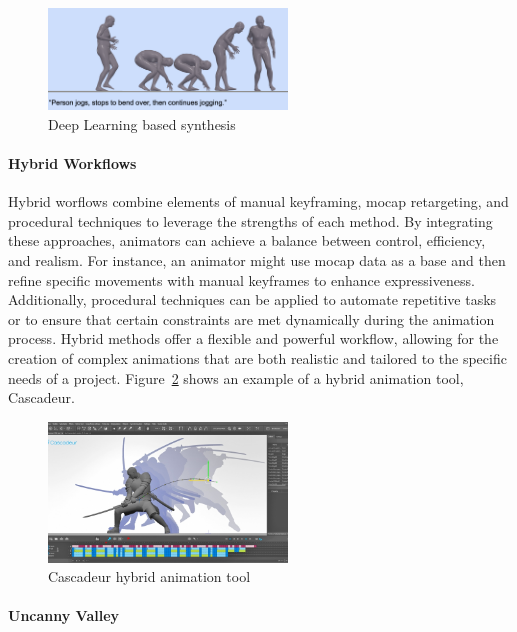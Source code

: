 \documentclass[../../main.tex]{subfiles}
\begin{document}
\begin{figure} 
  \centering \includegraphics[width = 2.5in]{chapters/background_work/images/deep_learning_synthesis.png} 
  \caption{Deep Learning based synthesis} 
  \label{fig:deep_learning_synthesis} 
\end{figure}

\paragraph{Hybrid Workflows}
\label{ch:background_work:sign_language_synthesis:3d_techniques:avatar_animation:hybrid_workflows}

Hybrid worflows combine elements of manual keyframing, mocap retargeting, and procedural techniques to leverage the strengths of each method. By integrating these approaches, animators can achieve a balance between control, efficiency, and realism. For instance, an animator might use mocap data as a base and then refine specific movements with manual keyframes to enhance expressiveness. Additionally, procedural techniques can be applied to automate repetitive tasks or to ensure that certain constraints are met dynamically during the animation process. Hybrid methods offer a flexible and powerful workflow, allowing for the creation of complex animations that are both realistic and tailored to the specific needs of a project. Figure~\ref{fig:cascadeur} shows an example of a hybrid animation tool, Cascadeur.

\begin{figure} 
  \centering \includegraphics[width = 2.5in]{chapters/background_work/images/cascadeur.png} 
  \caption{Cascadeur hybrid animation tool} 
  \label{fig:cascadeur} 
\end{figure}

\paragraph{Uncanny Valley}
\label{ch:background_work:sign_language_synthesis:3d_techniques:avatar_animation:uncanny_valley}
\end{document}
